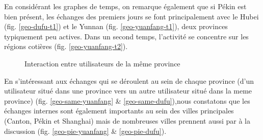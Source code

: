 En consid\'erant les graphes de temps, on remarque \'egalement que si P\'ekin est bien pr\'esent, les \'echanges des premiers jours se font principalement avec le Hubei (fig. \ref{geo-dufu-t1}) et le Yunnan (fig. \ref{geo-yuanfang-t1}), deux provinces typiquement peu actives. Dans un second temps, l'activité se concentre sur les régions cotières (fig. \ref{geo-yuanfang-t2}).

\begin{figure}[H]
    \centering

     

    \caption{
        Interaction entre utilisateurs de la m\^eme province
    }

\end{figure}

En s{\textquoteright}int\'eressant aux \'echanges qui se d\'eroulent au
sein de chaque province (d{\textquoteright}un utilisateur situ\'e dans
une province vers un autre utilisateur situ\'e dans la meme province) (fig. \ref{geo-same-yuanfang} \& \ref{geo-same-dufu}),nous constatons que les \'echanges internes sont \'egalement importants
au sein des villes principales (Canton, P\'ekin et Shanghai) mais de
nombreuses villes prennent aussi par \`a la discussion (fig. \ref{geo-pie-yuanfang} \& \ref{geo-pie-dufu}). 


